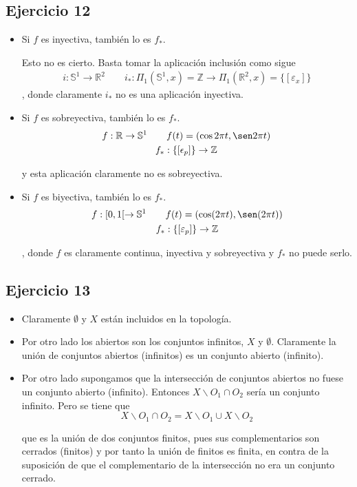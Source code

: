 \documentclass{article}
\begin{document}
\subsection{Ejercicio 12}
\begin{itemize}
\item Si $f$ es inyectiva, también lo es $f_*$.

Esto no es cierto. Basta tomar la aplicación inclusión como sigue
\begin{gather*}
i:\mathbb{S}^1\rightarrow \mathbb{R}^2\qquad i_*:\Pi_1(\mathbb{S}^1,x)=\mathbb{Z}\rightarrow \Pi_1(\mathbb{R}^2,x)=\{[\varepsilon_x]\}
\end{gather*}
, donde claramente $i_*$ no es una aplicación inyectiva.

\item Si $f$ es sobreyectiva, también lo es $f_*$.
\begin{gather*}
f:\mathbb{R}\rightarrow \mathbb{S}^1\qquad f(t)=(\cos2\pi t,\sen2\pi t)\\
f_*:\{[\epsilon_p]\}\rightarrow \mathbb{Z}
\end{gather*}

y esta aplicación claramente no es sobreyectiva.

\item Si $f$ es biyectiva, también lo es $f_*$.
\begin{gather*}
f:[0,1[\rightarrow \mathbb{S}^1\qquad f(t)=(\cos(2\pi t),\sen(2\pi t))\\
f_*:\{[\varepsilon_p]\}\rightarrow \mathbb{Z}
\end{gather*}

, donde $f$ es claramente continua, inyectiva y sobreyectiva y $f_*$ no puede serlo.
\end{itemize}

\subsection{Ejercicio 13}
\begin{itemize}
\item Claramente $\emptyset$ y $X$ están incluidos en la topología.

\item Por otro lado los abiertos son los conjuntos infinitos, $X$ y $\emptyset$. Claramente la unión de conjuntos abiertos (infinitos) es un conjunto abierto (infinito).

\item Por otro lado supongamos que la intersección de conjuntos abiertos no fuese un conjunto abierto (infinito). Entonces $X\backslash O_1\cap O_2$ sería un conjunto infinito. Pero se tiene que 
\begin{equation*}
X\backslash O_1\cap O_2 = X\backslash O_1\cup X\backslash O_2
\end{equation*}

que es la unión de dos conjuntos finitos, pues sus complementarios son cerrados (finitos) y por tanto la unión de finitos es finita, en contra de la suposición de que el complementario de la intersección no era un conjunto cerrado.
\end{itemize}
\end{document}
